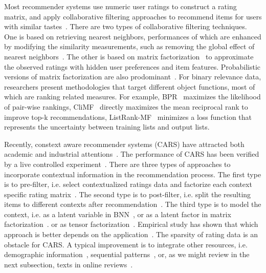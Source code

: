 \documentclass[preprint,12pt]{elsarticle}
\begin{document}
Most recommender systems use numeric user ratings to construct a rating matrix, and apply collaborative filtering approaches to recommend items for users with similar tastes~\cite{Bobadilla2013Recommender}. There are two types of collaborative filtering techniques. One is based on retrieving nearest neighbors, performances of which are enhanced by modifying the similarity measurements, such as removing the global effect of nearest neighbors~\cite{Bell2007Scalable}. The other is based on matrix factorization~\cite{Koren2009Matrix} to approximate the observed ratings with hidden user preferences and item features. Probabilistic versions of matrix factorization are also prodominant~\cite{salakhutdinov2008probabilistic}. For binary relevance data, researchers present methodologies that target different object functions, most of which are ranking related measures. For example, BPR~\cite{Rendle2009BPR} maximizes the likelihood of pair-wise rankings, CliMF~\cite{Shi2012CLiMF} directly maximizes the mean reciprocal rank to improve top-k recommendations, ListRank-MF~\cite{Shi2010Listwise} minimizes a loss function that  represents the uncertainty between training lists and output lists.

Recently, constext aware recommender systems (CARS) have attracted both academic and industrial attentions~\cite{Adomavicius2011Context}. The performance of CARS has been verified by a live controlled experiment~\cite{Gorgoglione2011Effect}. There are three types of approaches to incorporate contextual information in the recommendation process. The first type is to pre-filter, i.e. select contextualized ratings data and factorize each context specific rating matrix~\cite{Adomavicius2005Incorporating}. The second type is to post-filter, i.e. split the resulting items to different contexts after recommendation~\cite{Baltrunas2009Context}. The third type is to model the context, i.e. as a latent variable in BNN~\cite{Palmisano2008Using}, or as a latent factor in matrix factorization~\cite{Baltrunas2011Context}. or as tensor factorization~\cite{Wang2015CROWN,Karatzoglou2010Multiverse}. Empirical study has shown that which approach is better depends on the application~\cite{Panniello2009Experimental}. The sparsity of rating data is an obstacle for CARS. A typical improvement is to integrate other resources, i.e. demographic information~\cite{Li2011Towards}, sequential patterns~\cite{Hariri2012Context}, or, as we might review in the next subsection, texts in online reviews~\cite{Li2010Contextual,Levi2012Finding,Hariri2013Query,Liu2013Combining}.
\end{document}
